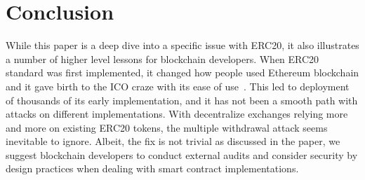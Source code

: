 
\section{Conclusion}

While this paper is a deep dive into a specific issue with ERC20, it also illustrates a number of higher level lessons for blockchain developers. When ERC20 standard was first implemented, it changed how people used Ethereum blockchain and it gave birth to the ICO craze with its ease of use~\cite{fenu2018ico}. This led to deployment of thousands of its early implementation, and it has not been a smooth path with attacks on different implementations. With decentralize exchanges relying more and more on existing ERC20 tokens, the multiple withdrawal attack seems inevitable to ignore. Albeit, the fix is not trivial as discussed in the paper, we suggest blockchain developers to conduct external audits and consider security by design practices when dealing with smart contract implementations. 



